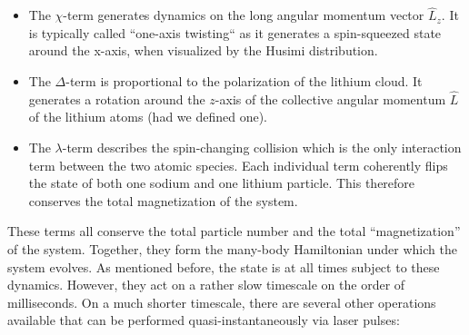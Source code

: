 \documentclass[a4paper, 10pt]{article}
\begin{document}
    \begin{itemize}
        \item The $\chi$-term generates dynamics on the long angular momentum vector $\hat{L}_z$. It is typically called ``one-axis twisting`` as it generates a spin-squeezed state around the x-axis, when visualized by the Husimi distribution. 
    
        \item The $\Delta$-term is proportional to the polarization of the lithium cloud. It generates a rotation around the $z$-axis of the collective angular momentum $\hat{L}$ of the lithium atoms (had we defined one). 
        
        \item The $\lambda$-term describes the spin-changing collision which is the only interaction term between the two atomic species. Each individual term coherently flips the state of both one sodium and one lithium particle. This therefore conserves the total magnetization of the system. 
        
    \end{itemize}
    
    These terms all conserve the total particle number and the total ``magnetization'' of the system.  
    Together, they form the many-body Hamiltonian under which the system evolves.
    As mentioned before, the state is at all times subject to these dynamics.
    However, they act on a rather slow timescale on the order of milliseconds.
    On a much shorter timescale, there are several other operations available that can be performed quasi-instantaneously via laser pulses:
    
\end{document}
